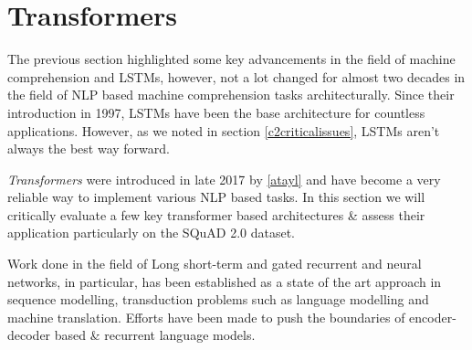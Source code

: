 \documentclass[a4paper,12pt]{report}
\begin{document}
	    \section{Transformers}\label{23}
	    
	    	The previous section highlighted some key advancements in the field of machine comprehension and LSTMs, however, not a lot changed for almost two decades in the field of NLP based machine comprehension tasks architecturally. Since their introduction in 1997, LSTMs \cite{lstmoriginal} have been the base architecture for countless applications. However, as we noted in section \ref{c2criticalissues}, LSTMs aren't always the best way forward. 
			
			\textit{Transformers} were introduced in late 2017 by \ref{atayl} and have become a very reliable way to implement various NLP based tasks. In this section we will critically evaluate a few key transformer based architectures \& assess their application particularly on the SQuAD 2.0 dataset.

	        Work done in the field of Long short-term and gated recurrent \citep{lstmoriginal} and \citep{recurrent} neural networks, in particular, has been established as a state of the art approach in sequence modelling, transduction problems such as language modelling and machine translation.  Efforts have been made to push the boundaries of encoder-decoder based \& recurrent language models.
\end{document}

